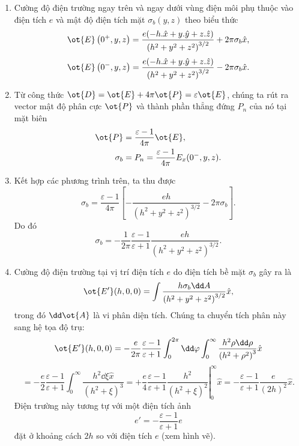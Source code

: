  \begin{loigiai}
\begin{enumerate}[1)]
   \item Cường độ điện trường ngay trên và ngay dưới vùng điện môi phụ thuộc vào điện tích $e$ và mật độ điện tích mặt $\sigma_b (y,z)$ theo biểu thức
       $$\ot{E}\left(0^{+}, y, z\right)=\frac{e(-h. \hat{{x}}+y .\hat{{y}}+z. \hat{{z}})}{\left(h^{2}+y^{2}+z^{2}\right)^{3 / 2}}+2 \pi \sigma_{b} \hat{{x}},$$
      $$\ot{E}\left(0^{-}, y, z\right)=\frac{e(-h .\hat{{x}}+y. \hat{y}+z. \hat{{z}})}{\left(h^{2}+y^{2}+z^{2}\right)^{3 / 2}}-2 \pi \sigma_{b} \hat{{x}}.$$
  \item Từ công thức $\ot{D} = \ot{E} + 4\pi \ot{P} = \varepsilon \ot{E}$, chúng ta rút ra vector mật độ phân cực $\ot{P}$ và thành phần thẳng đứng $P_n$ của nó tại mặt biên
  \[\begin{aligned}
      \ot{P} &= \frac{\varepsilon -1 }{4\pi} \ot{E},\\
      \sigma_b &= P_n = \frac{\varepsilon -1}{4\pi}E_x (0^-,y,z).
  \end{aligned}\]
  \item Kết hợp các phương trình trên, ta thu được
   $$\sigma_b = \frac{\varepsilon -1}{4\pi} \left[-\frac{eh}{(h^2+y^2+z^2)^{3/2}} -2\pi \sigma_b \right].$$
Do đó
   $$\sigma_b= -\frac{1}{2\pi}\frac{\varepsilon -1}{\varepsilon +1} \frac{eh}{(h^2+y^2+z^2)^{3/2}}.$$
\item Cường độ điện trường tại vị trí điện tích $e$ do điện tích bề mặt $\sigma_b$ gây ra là
    $$\ot{E^{\prime}}(h, 0,0)=\int \frac{h \sigma_{b} \dd A}{\left(h^{2}+y^{2}+z^{2}\right)^{3 / 2}} \hat{{x}},$$
trong đó $\dd\ot{A}$ là vi phân diện tích. Chúng ta chuyển tích phân này sang hệ tọa độ trụ:
   $$\ot{E^{\prime}}(h, 0,0)=-\frac{e}{2 \pi} \frac{\varepsilon-1}{\varepsilon+1} \int_{0}^{2 \pi} \dd \varphi \int_{0}^{\infty} \frac{h^{2} \rho \dd \rho}{\left(h^{2}+\rho^{2}\right)^{3}} \hat{{x}}$$
    $$=-\frac{e}{2} \frac{\varepsilon-1}{\varepsilon+1} \int_{0}^{\infty} \frac{h^{2} \dd \xi \hat{{x}}}{\left(h^{2}+\xi\right)^{3}}=+\left.\frac{e}{4} \frac{\varepsilon-1}{\varepsilon+1} \frac{h^{2}}{\left(h^{2}+\xi\right)^{2}}\right|_{0} ^{\infty} \hat{{x}}=-\frac{\varepsilon-1}{\varepsilon+1} \frac{e}{(2 h)^{2}} \hat{{x}}.$$
Điện trường này tương tự với một điện tích ảnh 
    $$ e' = - \frac{\varepsilon-1}{\varepsilon +1}e$$
đặt ở khoảng cách $2h$ so với điện tích $e$ (xem hình vẽ).
    \begin{center}




\end{center}
\end{enumerate}
\end{loigiai}
